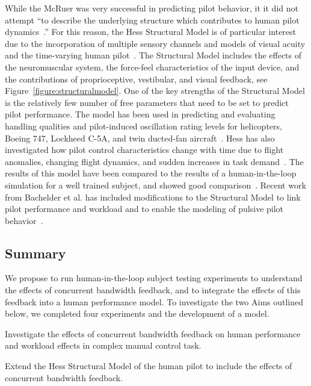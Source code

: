 While the McRuer was very successful in predicting pilot behavior, it it did not attempt ``to describe the underlying structure which contributes to human pilot dynamics~\citep{hess_structural_1980}.''
For this reason, the Hess Structural Model is of particular interest due to the incorporation of multiple sensory channels and models of visual acuity and the time-varying human pilot~\citep{hess_modeling_2009}.
The Structural Model includes the effects of the neuromuscular system, the force-feel characteristics of the input device, and the contributions of proprioceptive, vestibular, and visual feedback, see Figure~\ref{figure:structuralmodel}.
One of the key strengths of the Structural Model is the relatively few number of free parameters that need to be set to predict pilot performance.
The model has been used in predicting and evaluating handling qualities and pilot-induced oscillation rating levels for helicopters, Boeing 747, Lockheed C-5A, and twin ducted-fan aircraft~\citep{hess_analytical_2013, andreea-irina_prediction_2014, grant_handling_2015}.
Hess has also investigated how pilot control characteristics change with time due to flight anomalies, changing flight dynamics, and sudden increases in task demand~\citep{hess_modeling_2009, hess_modeling_2016}.
The results of this model have been compared to the results of a human-in-the-loop simulation for a well trained subject, and showed good comparison~\citep{hess_modeling_2016}.
Recent work from Bachelder et al. has included modifications to the Structural Model to link pilot performance and workload and to enable the modeling of pulsive pilot behavior~\citep{bachelder_modeling_2017, bachelder_linking_2018}.

\subsection{Summary}
We propose to run human-in-the-loop subject testing experiments to understand the effects of concurrent bandwidth feedback, and to integrate the effects of this feedback into a human performance model.
To investigate the two Aims outlined below, we completed four experiments and the development of a model.

\begin{description}[align=left]
    \item [Aim One] Investigate the effects of concurrent bandwidth feedback on human performance and workload effects in complex manual control task.
    \item [Aim Two] Extend the Hess Structural Model of the human pilot to include the effects of concurrent bandwidth feedback.
\end{description}

